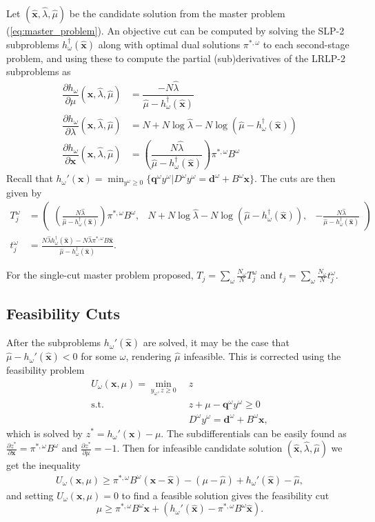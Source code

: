 \documentclass[11pt]{article}
\newcommand{\x}{\mathbf{x}}
\newcommand{\xh}{\hat{\x}}
\newcommand{\lh}{\hat{\lambda}}
\newcommand{\mh}{\hat{\mu}}
\newcommand{\q}{\mathbf{q}}
\renewcommand{\d}{\mathbf{d}}
\newcommand{\st}{\mbox{s.t.}}
\begin{document}
Let $(\xh,\lh,\mh)$ be the candidate solution from the master problem (\ref{eq:master_problem}).
An objective cut can be computed by solving the SLP-2 subproblems $h^\dagger_\omega(\xh)$ along with optimal dual solutions $\pi^{*,\omega}$ to each second-stage problem, and using these to compute the partial (sub)derivatives of the LRLP-2 subproblems as
\begin{align*}
	\dfrac{\partial h_\omega}{\partial \mu}(\xh,\lh,\mh) & = \dfrac{-N\lh}{\mh - h^\dagger_\omega(\xh)} \\
	\dfrac{\partial h_\omega}{\partial \lambda}(\xh,\lh,\mh) & = N + N\log\lh - N \log(\mh - h^\dagger_\omega(\xh)) \\
	\dfrac{\partial h_\omega}{\partial \x}(\xh,\lh,\mh) & = \left(\dfrac{N\lh}{\mh - h^\dagger_\omega(\xh)}\right) \pi^{*,\omega} B^\omega
\end{align*}
Recall that $h_\omega'(\x) = \min_{y^\omega \geq 0} \{\q^\omega y^\omega | D^\omega y^\omega = \d^\omega + B^\omega \x\}$.
The cuts are then given by
\begin{align*}
	T_j^\omega & = 
	\left( \begin{array}{ccc}
		\left(\frac{N\lh}{\mh - h^\dagger_\omega(\xh)}\right) \pi^{*,\omega} B^\omega, 
			 & N + N\log\lh - N\log(\mh - h^\dagger_\omega(\xh)), 
			 & -\frac{N\lh}{\mh - h^\dagger_\omega(\xh)}
	\end{array} \right) \\
	t_j^\omega & = \frac{N \lh h^\dagger_\omega(\xh) - N \lh \pi^{*,\omega}B\xh}{\mh - h^\dagger_\omega(\xh)}.
\end{align*}

For the single-cut master problem proposed, $T_j = \sum_\omega \frac{N_\omega}{N} T_j^\omega$ and $t_j = \sum_\omega \frac{N_\omega}{N} t_j^\omega$.

\subsection{Feasibility Cuts}
After the subproblems $h_\omega'(\xh)$ are solved, it may be the case that $\mh - h_\omega'(\xh) < 0$ for some $\omega$, rendering $\mh$ infeasible.
This is corrected using the feasibility problem
\begin{align*}
	U_\omega(\x,\mu) = \min_{y_\omega,z \geq 0} \ & z \\
	\st \ & z + \mu - \q^\omega y^\omega \geq 0 \\
	& D^\omega y^\omega = \d^\omega + B^\omega \x,
\end{align*}
which is solved by $z^* = h_\omega'(\x) - \mu$.
The subdifferentials can be easily found as $\frac{\partial z^*}{\partial \x} = \pi^{*,\omega} B^\omega$ and $\frac{\partial z^*}{\partial \mu} = -1$.
Then for infeasible candidate solution $(\xh,\lh,\mh)$ we get the inequality
\begin{align*}
	U_\omega(\x,\mu) \geq \pi^{*,\omega}B^\omega(\x-\xh) - (\mu -\mh) + h_\omega'(\xh) - \mh,
\end{align*}
and setting $U_\omega(\x,\mu) = 0$ to find a feasible solution gives the feasibility cut
\[
	\mu \geq \pi^{*,\omega}B^\omega \x + (h_\omega'(\xh) - \pi^{*,\omega}B^\omega\xh).
\]
\end{document}
